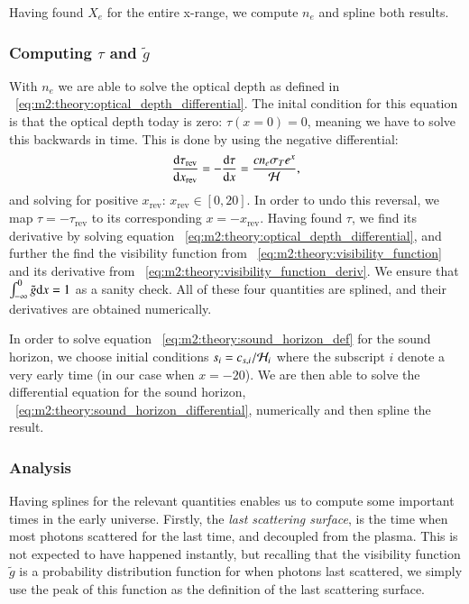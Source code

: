     Having found $X_e$ for the entire x-range, we compute $n_e$ and spline both results.

\subsubsection{Computing $\tau$ and $\tilde{g}$}\label{sec:m2:methods:tau_and_g}
    With $n_e$ we are able to solve the optical depth as defined in ~\cref{eq:m2:theory:optical_depth_differential}. The inital condition for this equation is that the optical depth today is zero: $\tau(x=0)=0$, meaning we have to solve this backwards in time. This is done by using the negative differential:
    \begin{equation}
        \dv{\tau_\mathrm{rev}}{x_\mathrm{rev}} = -\dv{\tau}{x} = \frac{cn_e\sigma_Te^x}{\mathcal{H}},
    \end{equation}
    and solving for positive $x_\mathrm{rev}$: $x_\mathrm{rev}\in[0,20]$. In order to undo this reversal, we map $\tau=-\tau_\mathrm{rev}$ to its corresponding $x=-x_\mathrm{rev}$. Having found $\tau$, we find its derivative by solving equation ~\cref{eq:m2:theory:optical_depth_differential}, and further the find the visibility function from ~\cref{eq:m2:theory:visibility_function} and its derivative from ~\cref{eq:m2:theory:visibility_function_deriv}. We ensure that $\int_{-\infty}^0\tilde{g}\mathrm{d} x=1$ as a sanity check. All of these four quantities are splined, and their derivatives are obtained numerically.

    In order to solve equation ~\cref{eq:m2:theory:sound_horizon_def} for the sound horizon, we choose initial conditions $s_i = c_{s,i}/{\mathcal{H}_i}$ where the subscript $i$ denote a very early time (in our case when $x=-20$). We are then able to solve the differential equation for the sound horizon, ~\cref{eq:m2:theory:sound_horizon_differential}, numerically and then spline the result. 


\subsubsection{Analysis}\label{sec:m2:methods:analysis}
    Having splines for the relevant quantities enables us to compute some important times in the early universe. Firstly, the \textit{last scattering surface}, is the time when most photons scattered for the last time, and decoupled from the plasma. This is not expected to have happened instantly, but recalling that the visibility function $\tilde{g}$ is a probability distribution function for when photons last scattered, we simply use the peak of this function as the definition of the last scattering surface. 

